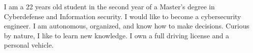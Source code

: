
\begin{cvparagraph}
I am a 22 years old student in the second year of a Master's degree in Cyberdefense and Information security. 
I would like to become a cybersecurity engineer. I am autonomous, organized, and know how to make decisions.
Curious by nature, I like to learn new knowledge. I own a full driving license and a personal vehicle.
\end{cvparagraph}
